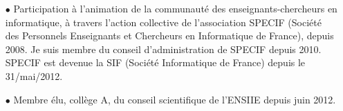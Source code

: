 \documentclass[11pt]{article}
\begin{document}
\begin{itemize}
\item[$\bullet$] 
Participation à l'animation de la communauté des enseignants-chercheurs en informatique, à travers 
l'action collective de l'association SPECIF (Société des Personnels Enseignants et Chercheurs 
en Informatique de France), depuis 2008. Je suis membre du conseil d'administration de SPECIF depuis 
2010. SPECIF est devenue la SIF (Société Informatique de France) depuis le 31/mai/2012.\\

\item[$\bullet$] 
Membre élu, collège A, du conseil scientifique de l'ENSIIE depuis juin 2012. 
\vspace{1cm}
\end{itemize}



\newpage
\end{document}

